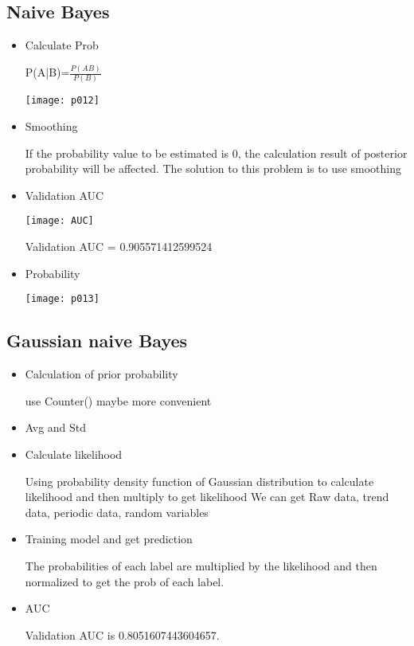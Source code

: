 \subsection{Naive Bayes}
\begin{itemize}
\item Calculate Prob
\par
P(A|B)=$\frac{P(AB)}{P(B)}$
\par
\texttt{[image: p012]}
\item Smoothing
\par
If the probability value to be estimated is 0, the calculation result of posterior probability will be affected. The solution to this problem is to use smoothing
\par
\item Validation AUC
\par
\texttt{[image: AUC]}
\par
Validation AUC = 0.905571412599524
\par
\item Probability
\par
\texttt{[image: p013]}
\end{itemize}


\subsection{Gaussian naive Bayes}
\begin{itemize}
\item Calculation of prior probability
\par
use Counter() maybe more convenient
\par
\item Avg and Std
\par
\item Calculate likelihood
\par
Using probability density function of Gaussian distribution to calculate likelihood and then multiply to get likelihood
We can get Raw data, trend data, periodic data, random variables
\par
\item Training model and get prediction
\par
The probabilities of each label are multiplied by the likelihood and then normalized to get the prob of each label.
\item AUC
\par
Validation AUC is 0.8051607443604657.
\end{itemize}




